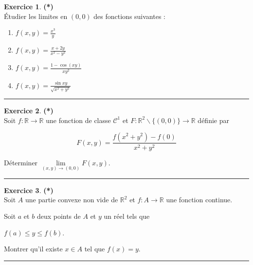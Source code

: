 \documentclass[a4paper,11pt]{article}
\theoremstyle{definition}
\newtheorem{exo}{Exercice} %
\begin{document}
\begin{minipage}{1\linewidth}\begin{minipage}[t]{0.48\linewidth}\raggedright
	
\begin{exo}\textbf{(*)}\quad\\[0.2cm]
	Étudier les limites en $(0,0)$ des fonctions suivantes :
	\begin{multicols}{2}
		\begin{enumerate}
			\item $f(x, y)= \frac{x^{3}}{y}$
			\item $f(x, y)= \frac{x+2 y}{x^{2}-y^{2}}$
			\item $f(x, y)= \frac{1-\cos (x y)}{x y^{2}}$
			\item $f(x, y)=\frac{\sin x y}{\sqrt{x^{2}+y^{2}}}$
		\end{enumerate}
	\end{multicols}

	
\centering\rule{1\linewidth}{0.6pt}\end{exo}


\begin{exo}\textbf{(*)}\quad\\[0.2cm]
	
	Soit $f: \mathbb{R} \rightarrow \mathbb{R}$ une fonction de classe $\mathcal{C}^{1}$ et $F: \mathbb{R}^{2} \backslash\{(0,0)\} \rightarrow \mathbb{R}$ définie par
	
	$$
	F(x, y)=\frac{f\left(x^{2}+y^{2}\right)-f(0)}{x^{2}+y^{2}}
	$$
	
	Déterminer $\lim\limits_{(x, y) \rightarrow(0,0)} F(x, y)$.

\centering\rule{1\linewidth}{0.6pt}\end{exo}


\begin{exo}\textbf{(*)}\quad\\[0.2cm]
	
	Soit $A$ une partie convexe non vide de $\mathbb{R}^{2}$ et $f: A \rightarrow \mathbb{R}$ une fonction continue.
	
	Soit $a$ et $b$ deux points de $A$ et $y$ un réel tels que \begin{center}
		$f(a) \leq y \leq f(b)$.
	\end{center}
	
	Montrer qu'il existe $x \in A$ tel que $f(x)=y$.
	
\centering\rule{1\linewidth}{0.6pt}\end{exo}




\end{minipage}
\end{minipage}
\end{document}
